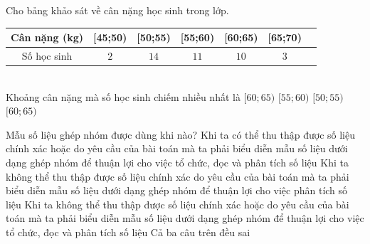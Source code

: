 \begin{ex}%
	Cho bảng khảo sát về cân nặng học sinh trong  lớp.
	\begin{table}[h]
		 \centering
		\begin{tabular}{|c|c|c|c|c|c|c|}
			 \hline
			Cân nặng (kg) & [45;50) & [50;55) &  [55;60) & [60;65) & [65;70) \\
			 \hline
			Số học sinh & $2$ & $14$ & $11$ &  $10$ & $3$ \\ \hline
		\end{tabular}
	\end{table}\\
	Khoảng cân nặng mà số học sinh chiếm nhiều nhất  là
	 \choice
		 {$[60;65)$}
		{$[55;60)$} 
		{\True  $[50;55)$}
		{$[60;65)$} 
\end{ex}

\begin{ex}%
	Mẫu số liệu ghép nhóm được dùng khi nào? 
	\choice 
		{Khi ta có thể thu thập được  số liệu chính xác hoặc do yêu cầu của bài toán mà ta phải biểu diễn mẫu số liệu dưới dạng ghép nhóm để thuận lợi cho việc tổ chức, đọc và phân tích số liệu}
		{Khi ta không thể thu thập được số liệu chính xác do yêu cầu của bài toán mà ta  phải biểu diễn mẫu số liệu dưới dạng ghép nhóm để thuận lợi cho việc phân tích số liệu}
		{\True Khi ta không thể thu thập được số liệu chính xác hoặc do yêu cầu của bài toán mà ta phải  biểu diễn mẫu số liệu dưới dạng ghép nhóm để thuận lợi cho việc tổ chức, đọc và phân tích số liệu}
		{Cả  ba câu trên đều sai}
\end{ex}

